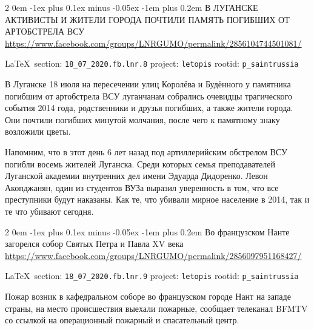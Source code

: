 \documentclass[a4paper,11pt]{extreport}
\makeatletter
\renewcommand\subsection{%
  \clearpage
    \@startsection{subsection}%
    {2}%
    {0em}%
    {-1ex plus 0.1ex minus -0.05ex}%
    {-1em plus 0.2em}%
    {\scshape\bfseries\Large}%
}
\makeatother
\begin{document}
 
\subsection{В ЛУГАНСКЕ АКТИВИСТЫ И ЖИТЕЛИ ГОРОДА ПОЧТИЛИ ПАМЯТЬ ПОГИБШИХ ОТ АРТОБСТРЕЛА ВСУ}
\label{sec:18_07_2020.fb.lnr.8}
\url{https://www.facebook.com/groups/LNRGUMO/permalink/2856104744501081/}
  
\vspace{0.5cm}
{\small\LaTeX~section: \verb|18_07_2020.fb.lnr.8| project: \verb|letopis| rootid: \verb|p_saintrussia|}
\vspace{0.5cm}

В Луганске 18 июля на пересечении улиц Королёва и Будённого у памятника
погибшим от артобстрела ВСУ луганчанам собрались очевидцы трагического события
2014 года, родственники и друзья погибших, а также жители города. Они почтили
погибших минутой молчания, после чего к памятному знаку возложили цветы.

Напомним, что в этот день 6 лет назад под артиллерийским обстрелом ВСУ погибли
восемь жителей Луганска. Среди которых семья преподавателей Луганской академии
внутренних дел имени Эдуарда Дидоренко. Левон Акопджанян, один из студентов
ВУЗа выразил уверенность в том, что все преступники будут наказаны. Как те, что
убивали мирное население в 2014, так и те что убивают сегодня.
  
 
 
\subsection{Во французском Нанте загорелся собор Святых Петра и Павла XV века}
\label{sec:18_07_2020.fb.lnr.9}
\url{https://www.facebook.com/groups/LNRGUMO/permalink/2856097951168427/}
  
\vspace{0.5cm}
{\small\LaTeX~section: \verb|18_07_2020.fb.lnr.9| project: \verb|letopis| rootid: \verb|p_saintrussia|}
\vspace{0.5cm}

Пожар возник в кафедральном соборе во французском городе Нант на западе страны,
на место происшествия выехали пожарные, сообщает телеканал BFMTV со ссылкой на
операционный пожарный и спасательный центр.
\end{document}

